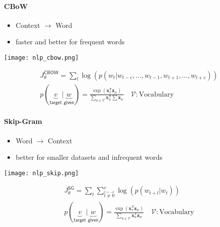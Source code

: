 \paragraph{CBoW}
\begin{itemize}
    \item Context $\to$ Word
    \item faster and better for frequent words
\end{itemize}

\begin{center}
    \texttt{[image: nlp\_cbow.png]}
\end{center}
\noindent\begin{gather*}
    J_\theta^{\mathsf{CBOW}}                                               = \sum_{t}\log\left(p(w_t|w_{t-c},\ldots, w_{t-1},w_{t+1},\ldots, w_{t+c})\right)                                   \\
    p(\underbrace{v}_{\textsf{target}} | \underbrace{w}_{\textsf{given}})  = \frac{\exp(\mathbf{x}_v^{\mathsf{T}}\mathbf{z}_w)}{\sum\limits_{u\in \mathcal{V}} \mathbf{x}_u^{\mathsf{T}}\sum\mathbf{z}_w} \quad \mathcal{V}: \text{Vocabulary}
\end{gather*}

\paragraph{Skip-Gram}
\begin{itemize}
    \item Word $\to$ Context
    \item better for smaller datasets and infrequent words
\end{itemize}

\begin{center}
    \texttt{[image: nlp\_skip.png]}
\end{center}
\noindent\begin{gather*}
    J_{\theta}^{\mathsf{SG}} = \sum_{t}\sum_{\overset{l=-c}{l\neq 0}}^{c} \log(p(w_{t+l}|w_t))\\
    p(\underbrace{v}_{\textsf{target}} | \underbrace{w}_{\textsf{given}})  = \frac{\exp(\mathbf{x}_v^{\mathsf{T}}\mathbf{z}_w)}{\sum\limits_{u\in \mathcal{V}} \mathbf{x}_u^{\mathsf{T}}\mathbf{z}_w} \quad \mathcal{V}: \text{Vocabulary}
\end{gather*}

